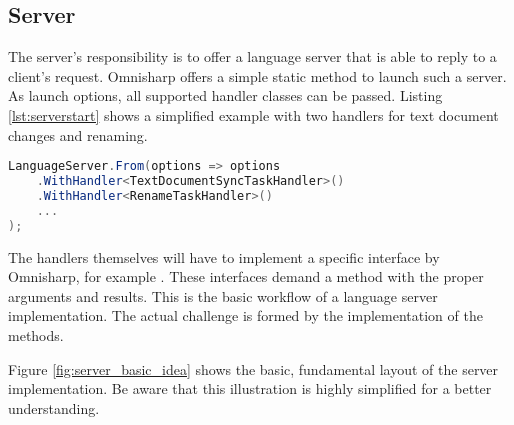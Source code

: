 



\subsection{Server}
The server's responsibility is to offer a language server that is able to reply to a client's request. Omnisharp offers a simple static method to launch such a server. As launch options, all supported handler classes can be passed. Listing \ref{lst:serverstart} shows a simplified example with two handlers for text document changes and renaming.

\begin{lstlisting}[language=csharp, caption={Language Server Initialization}, captionpos=b, label={lst:serverstart}]
LanguageServer.From(options => options
    .WithHandler<TextDocumentSyncTaskHandler>()
    .WithHandler<RenameTaskHandler>()
    ...
);
\end{lstlisting}

The handlers themselves will have to implement a specific interface by Omnisharp, for example . These interfaces demand a  method with the proper arguments and results. This is the basic workflow of a language server implementation. The actual challenge is formed by the implementation of the  methods.

Figure \ref{fig:server_basic_idea} shows the basic, fundamental layout of the server implementation. Be aware that this illustration is highly simplified for a better understanding.

